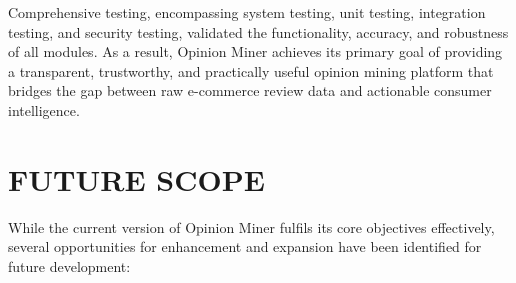 \documentclass[12pt,a4paper]{report}
\begin{document}
Comprehensive testing, encompassing system testing, unit testing, integration testing, and security testing, validated the functionality, accuracy, and robustness of all modules. As a result, Opinion Miner achieves its primary goal of providing a transparent, trustworthy, and practically useful opinion mining platform that bridges the gap between raw e-commerce review data and actionable consumer intelligence.

\section{FUTURE SCOPE}

While the current version of Opinion Miner fulfils its core objectives effectively, several opportunities for enhancement and expansion have been identified for future development:
\end{document}
